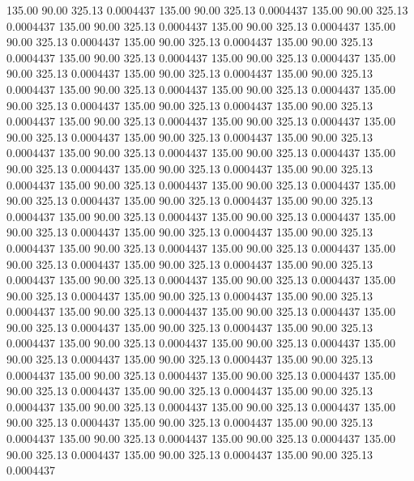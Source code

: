  135.00   90.00  325.13   0.0004437
 135.00   90.00  325.13   0.0004437
 135.00   90.00  325.13   0.0004437
 135.00   90.00  325.13   0.0004437
 135.00   90.00  325.13   0.0004437
 135.00   90.00  325.13   0.0004437
 135.00   90.00  325.13   0.0004437
 135.00   90.00  325.13   0.0004437
 135.00   90.00  325.13   0.0004437
 135.00   90.00  325.13   0.0004437
 135.00   90.00  325.13   0.0004437
 135.00   90.00  325.13   0.0004437
 135.00   90.00  325.13   0.0004437
 135.00   90.00  325.13   0.0004437
 135.00   90.00  325.13   0.0004437
 135.00   90.00  325.13   0.0004437
 135.00   90.00  325.13   0.0004437
 135.00   90.00  325.13   0.0004437
 135.00   90.00  325.13   0.0004437
 135.00   90.00  325.13   0.0004437
 135.00   90.00  325.13   0.0004437
 135.00   90.00  325.13   0.0004437
 135.00   90.00  325.13   0.0004437
 135.00   90.00  325.13   0.0004437
 135.00   90.00  325.13   0.0004437
 135.00   90.00  325.13   0.0004437
 135.00   90.00  325.13   0.0004437
 135.00   90.00  325.13   0.0004437
 135.00   90.00  325.13   0.0004437
 135.00   90.00  325.13   0.0004437
 135.00   90.00  325.13   0.0004437
 135.00   90.00  325.13   0.0004437
 135.00   90.00  325.13   0.0004437
 135.00   90.00  325.13   0.0004437
 135.00   90.00  325.13   0.0004437
 135.00   90.00  325.13   0.0004437
 135.00   90.00  325.13   0.0004437
 135.00   90.00  325.13   0.0004437
 135.00   90.00  325.13   0.0004437
 135.00   90.00  325.13   0.0004437
 135.00   90.00  325.13   0.0004437
 135.00   90.00  325.13   0.0004437
 135.00   90.00  325.13   0.0004437
 135.00   90.00  325.13   0.0004437
 135.00   90.00  325.13   0.0004437
 135.00   90.00  325.13   0.0004437
 135.00   90.00  325.13   0.0004437
 135.00   90.00  325.13   0.0004437
 135.00   90.00  325.13   0.0004437
 135.00   90.00  325.13   0.0004437
 135.00   90.00  325.13   0.0004437
 135.00   90.00  325.13   0.0004437
 135.00   90.00  325.13   0.0004437
 135.00   90.00  325.13   0.0004437
 135.00   90.00  325.13   0.0004437
 135.00   90.00  325.13   0.0004437
 135.00   90.00  325.13   0.0004437
 135.00   90.00  325.13   0.0004437
 135.00   90.00  325.13   0.0004437
 135.00   90.00  325.13   0.0004437
 135.00   90.00  325.13   0.0004437
 135.00   90.00  325.13   0.0004437
 135.00   90.00  325.13   0.0004437
 135.00   90.00  325.13   0.0004437
 135.00   90.00  325.13   0.0004437
 135.00   90.00  325.13   0.0004437
 135.00   90.00  325.13   0.0004437
 135.00   90.00  325.13   0.0004437
 135.00   90.00  325.13   0.0004437
 135.00   90.00  325.13   0.0004437
 135.00   90.00  325.13   0.0004437
 135.00   90.00  325.13   0.0004437
 135.00   90.00  325.13   0.0004437
